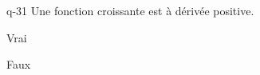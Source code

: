 \begin{truefalse}{q-31}
Une fonction croissante est à dérivée positive.
\item Vrai
\item* Faux
\end{truefalse}

